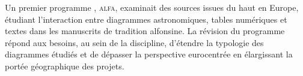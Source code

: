 Un premier programme \eida, \textsc{alfa}, examinait des sources issues du haut
\ma en Europe, étudiant l'interaction entre diagrammes
astronomiques, tables numériques et textes dans les manuscrits de
tradition alfonsine. La révision du programme répond aux besoins, au
sein de la discipline, d'étendre la typologie des diagrammes étudiés et
de dépasser la perspective eurocentrée en élargissant la portée
géographique des projets.
